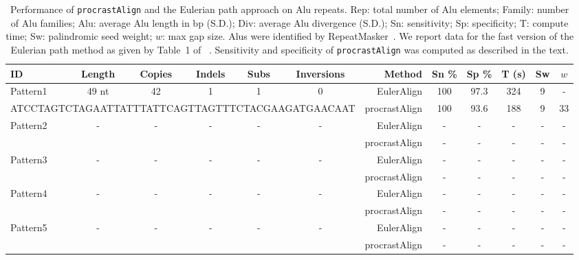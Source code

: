 \documentclass[twoside,11pt]{article}
\begin{document}
\begin{table}[t!]
\scriptsize
  \centering
\begin{tabular}{|lccccc|rccccc|}
\hline ID & Length & Copies & Indels & Subs & Inversions & Method & Sn \% & Sp \% & T (s) & Sw & $w$ \\
\hline
\hline Pattern1 &  49 nt &  42 & 1 & 1 & 0 & EulerAlign & 100 & 97.3 & 324 & 9 & - \\
\multicolumn{6}{|c|}{\tiny ATCCTAGTCTAGAATTATTTATTCAGTTAGTTTCTACGAAGATGAACAAT}& procrastAlign & 100 & 93.6 & 188 & 9 & 33 \\
\hline Pattern2 &   - &  - & - & - & - & EulerAlign & - & - & - & - & -  \\
\cline{7-12}                                            &&&&&& procrastAlign & - &- & - & - & -\\
\hline Pattern3 & - &  - & - & - & - & EulerAlign & - & -& - & - & - \\
\cline{7-12}                                            &&&&&& procrastAlign & -& - & -& - & - \\
\hline Pattern4 & - & - & - & - & - & EulerAlign & -& -& - & - & - \\
\cline{7-12}                                            &&&&&& procrastAlign & - &- & - & - &- \\
\hline Pattern5 & - & - & - & - & - & EulerAlign & -& -& - & - & - \\
\cline{7-12}                                            &&&&&& procrastAlign & - & - &- & - & - \\
\hline
\end{tabular}
\vspace{0.1cm}
  \caption{Performance of \texttt{procrastAlign} and the Eulerian path approach on Alu repeats.
  Rep: total number of Alu elements; Family: number of Alu
  families; Alu: average Alu length in bp (S.D.); Div: average Alu divergence (S.D.);
   Sn: sensitivity; Sp: specificity; T: compute time; Sw: palindromic seed weight; $w$: max gap size.  Alus were
  identified by RepeatMasker~\cite{ref-repbase}. We report data for the fast
  version of the Eulerian path method as given by Table~1 of ~\cite{ref-related1}. Sensitivity and specificity
  of \texttt{procrastAlign} was computed as described in the text.}
  \label{table:alu}
\end{table}
\end{document}
